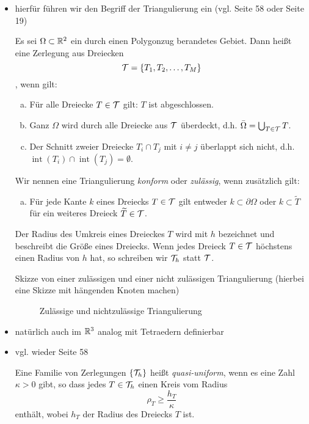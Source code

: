 \begin{itemize}
\item hierfür führen wir den Begriff der Triangulierung ein (vgl. \cite{BraeFEM} Seite 58 oder \cite{StarkePDE} Seite 19)
\begin{defi}[Triangulierung]
Es sei $\Omega \subset \mathbb{R}^2$ ein durch einen Polygonzug berandetes Gebiet. Dann heißt eine Zerlegung aus Dreiecken
\[
	\mathcal T = \{T_1,T_2,\ldots,T_M\}
\]
\textit{}, wenn gilt:
\begin{enumerate}[(a)]
\item Für alle Dreiecke $T \in \mathcal T$ gilt: $T$ ist abgeschlossen.
\item	Ganz $\Omega$ wird durch alle Dreiecke aus $\mathcal T$ überdeckt, d.h. $\bar\Omega = \bigcup_{T\in \mathcal T} T$.
\item Der Schnitt zweier Dreiecke $T_i\cap T_j$ mit $i \not = j$ überlappt sich nicht, d.h. $\operatorname{int}(T_i)\cap \operatorname{int}(T_j) = \emptyset$.
\end{enumerate}
Wir nennen eine Triangulierung \textit{konform} oder \textit{zulässig}, wenn zusätzlich gilt:
\begin{enumerate}[(d)]
\item Für jede Kante $k$ eines Dreiecks $T \in \mathcal T$ gilt entweder $k \subset \partial \Omega$ oder $k \subset \widetilde T$ für ein weiteres Dreieck $\widetilde T \in \mathcal T$. 
\end{enumerate}
Der Radius des Umkreis eines Dreieckes $T$ wird mit $h$ bezeichnet und beschreibt die Größe eines Dreiecks. Wenn jedes Dreieck $T \in \mathcal T$ höchstens einen Radius von $h$ hat, so schreiben wir $\mathcal T_h$ statt $\mathcal T$.
\end{defi}

\item[Skizze] von einer zulässigen und einer nicht zulässigen Triangulierung (hierbei eine Skizze mit hängenden Knoten machen)

\begin{figure}[h]
\caption{Zulässige und nichtzulässige Triangulierung}
\end{figure}

\item \begin{bem}
natürlich auch im $\mathbb{R}^3$ analog mit Tetraedern definierbar
\end{bem}

\item vgl. wieder \cite{BraeFEM} Seite 58
\begin{defi}
Eine Familie von Zerlegungen $\{\mathcal T_h\}$ heißt \textit{quasi-uniform}, wenn es eine Zahl $\kappa > 0$ gibt, so dass jedes $T \in \mathcal T_h$ einen Kreis vom Radius
\[
	\rho_T \ge \frac{h_T}\kappa
\]
enthält, wobei $h_T$ der Radius des Dreiecks $T$ ist.


\end{defi}
\end{itemize}
